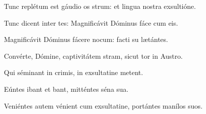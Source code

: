 \item {}

\item Tunc replétum est gáudio os strum:\psstar{} et lingua nostra exsultióne.

\item Tunc dicent inter tes:\psstar{} Magnificávit Dóminus fáce cum eis.

\item Magnificávit Dóminus fácere nocum:\psstar{} facti su lætántes.

\item Convérte, Dómine, captivitátem stram,\psstar{} sicut tor in Austro.

\item Qui séminant in crimis,\psstar{} in exsultatine metent.

\item Eúntes ibant et bant,\psstar{} mitténtes séna sua.

\item Veniéntes autem vénient cum exsultatine,\psstar{} portántes manílos suos.

